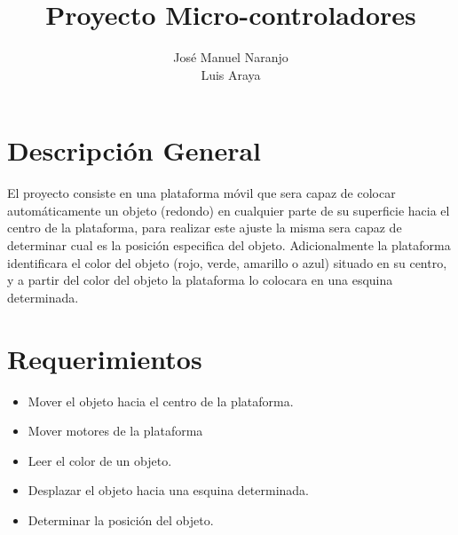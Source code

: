 \documentclass[12pt,letterpaper]{IEEEtran}
\title{Proyecto Micro-controladores}
\author{José Manuel Naranjo \\ Luis Araya}
\begin{document}
\renewcommand{\leftmark}{}

\maketitle
\section{Descripción General}

El proyecto consiste en una plataforma móvil que sera capaz de colocar automáticamente un objeto (redondo) en cualquier parte de su superficie hacia el centro de la plataforma, para realizar este ajuste la misma sera capaz de determinar cual es la posición especifica del objeto. Adicionalmente la plataforma identificara el color del objeto (rojo, verde, amarillo o azul) situado en su centro, y a partir del color del objeto la plataforma lo colocara en una esquina determinada.

\section{Requerimientos}
\begin{itemize}
	\item Mover el objeto hacia el centro de la plataforma. 
	\item Mover motores de la plataforma 	
	\item Leer el color de un objeto.
	\item Desplazar el objeto hacia una esquina determinada.
	\item Determinar la posición del objeto.
\end{itemize}
\end{document}
